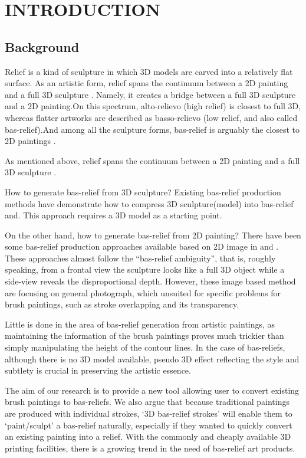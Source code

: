 \chapter{INTRODUCTION}

\section{Background}
Relief is a kind of sculpture in which 3D models are carved into a relatively flat surface. As an artistic form, relief spans the continuum between a 2D painting and a full 3D sculpture \cite{weyrich2007digital}. Namely, it creates a bridge between a full 3D sculpture and a 2D painting\cite{kerber2009feature}.On this spectrum, alto-relievo (high relief) is closest to full 3D, whereas flatter artworks are described as basso-relievo (low relief, and also called bas-relief).And  among all the sculpture forms, bas-relief is arguably the closest to 2D paintings \cite{kerber2009feature}. 

As mentioned above, relief spans the continuum between a 2D painting and a full 3D sculpture \cite{weyrich2007digital}.

How to generate bas-relief from 3D sculpture?  Existing bas-relief production methods have demonstrate how to compress 3D sculpture(model) into bas-relief \cite{weyrich2007digital}and\cite{kerber2009feature}. This approach requires a 3D model as a starting point. 

On the other hand, how to generate bas-relief from 2D painting?
There have been some bas-relief production approaches available based on 2D image in\cite{zeng2014region}\cite{wu2013making} and \cite{alexa2010reliefs}. These approaches almost follow the “bas-relief ambiguity”\cite{belhumeur1999bas}, that is, roughly speaking, from a frontal view the sculpture looks like a full 3D object while a side-view reveals the disproportional depth. 
However, these image based method are focusing on general photograph, which unsuited for specific problems for brush paintings, such as stroke overlapping and its transparency.  

Little is done in the area of bas-relief generation from artistic paintings, as maintaining the information of the brush paintings proves much trickier than simply manipulating the height of the contour lines. In the case of bas-reliefs, although there is no 3D model available, pseudo 3D effect reflecting the style and subtlety is crucial in preserving the artistic essence.

The aim of our research is to provide a new tool allowing user to convert existing brush paintings to bas-reliefs. We also argue that because traditional paintings are produced with individual strokes, ‘3D bas-relief strokes’ will enable them to ‘paint/sculpt’ a bas-relief naturally, especially if they wanted to quickly convert an existing painting into a relief. With the commonly and cheaply available 3D printing facilities, there is a growing trend in the need of bas-relief art products.

